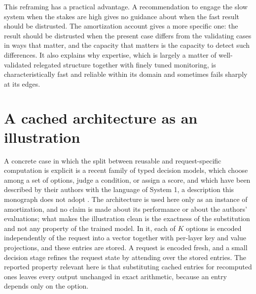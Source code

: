 \documentclass[11pt]{report}
\theoremstyle{remark}
\theoremstyle{definition}
\begin{document}
This reframing has a practical advantage. A recommendation to engage the slow system when the stakes are high gives no guidance about when the fast result should be distrusted. The amortization account gives a more specific one: the result should be distrusted when the present case differs from the validating cases in ways that matter, and the capacity that matters is the capacity to detect such differences. It also explains why expertise, which is largely a matter of well-validated relegated structure together with finely tuned monitoring, is characteristically fast and reliable within its domain and sometimes fails sharply at its edges.

\section{A cached architecture as an illustration}

A concrete case in which the split between reusable and request-specific computation is explicit is a recent family of typed decision models, which choose among a set of options, judge a condition, or assign a score, and which have been described by their authors with the language of System 1, a description this monograph does not adopt \cite{li2026}. The architecture is used here only as an instance of amortization, and no claim is made about its performance or about the authors' evaluations; what makes the illustration clean is the exactness of the substitution and not any property of the trained model. In it, each of $K$ options is encoded independently of the request into a vector together with per-layer key and value projections, and these entries are stored. A request is encoded fresh, and a small decision stage refines the request state by attending over the stored entries. The reported property relevant here is that substituting cached entries for recomputed ones leaves every output unchanged in exact arithmetic, because an entry depends only on the option.
\end{document}
